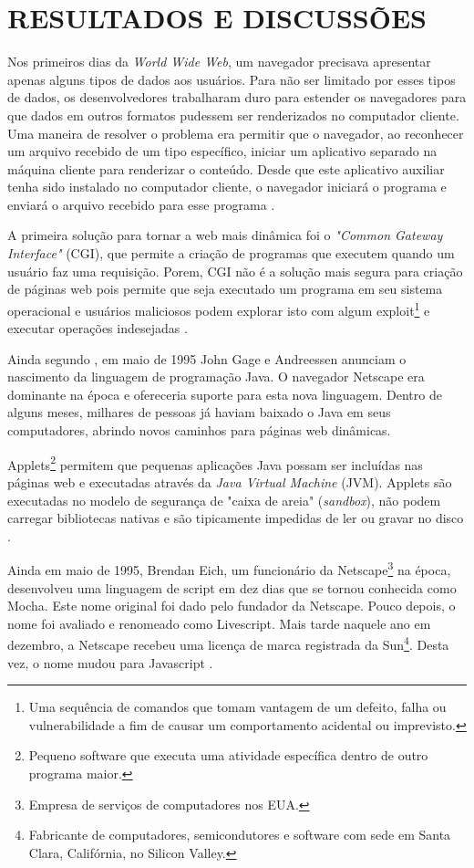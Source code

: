 \section{RESULTADOS E DISCUSSÕES}


Nos primeiros dias da \emph{World Wide Web}, um navegador precisava apresentar apenas alguns tipos de dados aos usuários. Para não ser limitado por esses tipos de dados, os desenvolvedores trabalharam duro para estender os navegadores para que dados em outros formatos pudessem ser renderizados no computador cliente. Uma maneira de resolver o problema era permitir que o navegador, ao reconhecer um arquivo recebido de um tipo específico, iniciar um aplicativo separado na máquina cliente para renderizar o conteúdo. Desde que este aplicativo auxiliar tenha sido instalado no computador cliente, o navegador iniciará o programa e enviará o arquivo recebido para esse programa \cite{zammetti2007brief}.

A primeira solução para tornar a web mais dinâmica foi o \emph{"Common Gateway Interface"} (CGI), que permite a criação de programas que executem quando um usuário faz uma requisição. Porem, CGI não é a solução mais segura para criação de páginas web pois permite que seja executado um programa em seu sistema operacional e usuários maliciosos podem explorar isto com algum exploit\footnote{Uma sequência de comandos que tomam vantagem de um defeito, falha ou vulnerabilidade a fim de causar um comportamento acidental ou imprevisto.} e executar operações indesejadas \cite{Asleson2006}.

Ainda segundo , em maio de 1995 John Gage e Andreessen anunciam o nascimento da linguagem de programação Java. O navegador Netscape era dominante na época e ofereceria suporte para esta nova linguagem. Dentro de alguns meses, milhares de pessoas já haviam baixado o Java em seus computadores, abrindo novos caminhos para páginas web dinâmicas.

Applets\footnote{Pequeno software que executa uma atividade específica dentro de outro programa maior.} permitem que pequenas aplicações Java possam ser incluídas nas páginas web e executadas através da \emph{Java Virtual Machine} (JVM). Applets são executadas no modelo de segurança de "caixa de areia" (\emph{sandbox}), não podem carregar bibliotecas nativas e são tipicamente impedidas de ler ou gravar no disco \cite{Asleson2006}.

Ainda em maio de 1995, Brendan Eich, um funcionário da Netscape\footnote{Empresa de serviços de computadores nos EUA.} na época, desenvolveu uma linguagem de script em dez dias que se tornou conhecida como Mocha. Este nome original foi dado pelo fundador da Netscape. Pouco depois, o nome foi avaliado e renomeado como Livescript. Mais tarde naquele ano em dezembro, a Netscape recebeu uma licença de marca registrada da Sun\footnote{Fabricante de computadores, semicondutores e software com sede em Santa Clara, Califórnia, no Silicon Valley.}. Desta vez, o nome mudou para Javascript \cite{neer2013history}.

